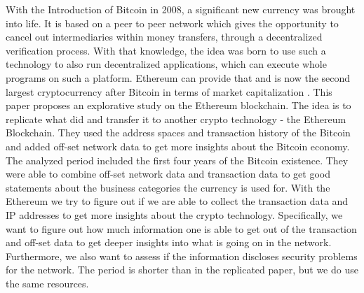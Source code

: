 With the Introduction of Bitcoin in 2008, a significant new currency was brought into life.
It is based on a peer to peer network which gives the opportunity to cancel out intermediaries within money transfers, through a decentralized verification process. 
With that knowledge, the idea was born to use such a technology to also run decentralized applications, which can execute whole programs on such a platform. 
Ethereum can provide that and is now the second largest cryptocurrency after Bitcoin in terms of market capitalization \cite{BitInfoEther, BitInfoBitcoin}.
This paper proposes an explorative study on the Ethereum blockchain. 
The idea is to replicate what \cite{lischke2016analyzing} did and transfer it to another crypto technology - the Ethereum Blockchain. 
They used the address spaces and transaction history of the Bitcoin and added off-set network data to get more insights about the Bitcoin economy. 
The analyzed period included the first four years of the Bitcoin existence. They were able to combine off-set network data and transaction data to get good statements about the business categories the currency is used for. 
With the Ethereum we try to figure out if we are able to collect the transaction data and IP addresses to get more insights about the crypto technology. Specifically, we want to figure out how much information one is able to get out of the transaction and off-set data to get deeper insights into what is going on in the network. Furthermore, we also want to assess if the information discloses security problems for the network. 
The period is shorter than in the replicated paper, but we do use the same resources.

